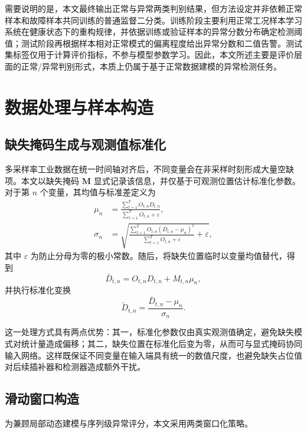 \documentclass[bachelor, vlined]{DissertUESTC}
\begin{document}
    需要说明的是，本文最终输出正常与异常两类判别结果，但方法设定并非依赖正常样本和故障样本共同训练的普通监督二分类。训练阶段主要利用正常工况样本学习系统在健康状态下的重构规律，并依据训练或验证样本的异常分数分布确定检测阈值；测试阶段再根据样本相对正常模式的偏离程度给出异常分数和二值告警。测试集标签仅用于计算评价指标，不参与模型参数学习。因此，本文所述主要是评价层面的正常/异常判别形式，本质上仍属于基于正常数据建模的异常检测任务。

    \section{数据处理与样本构造}

    \subsection{缺失掩码生成与观测值标准化}

    多采样率工业数据在统一时间轴对齐后，不同变量会在非采样时刻形成大量空缺项。本文以缺失掩码 $\mathbf{M}$ 显式记录该信息，并仅基于可观测位置估计标准化参数。对于第 $n$ 个变量，其均值与标准差定义为
    \begin{align}
        \mu_n &= \frac{\sum_{t=1}^{T} O_{t,n} D_{t,n}}{\sum_{t=1}^{T} O_{t,n} + \varepsilon}, \\
        \sigma_n &= \sqrt{\frac{\sum_{t=1}^{T} O_{t,n}(D_{t,n}-\mu_n)^2}{\sum_{t=1}^{T} O_{t,n} + \varepsilon} + \varepsilon},
    \end{align}
    其中 $\varepsilon$ 为防止分母为零的极小常数。随后，将缺失位置临时以变量均值替代，得到
    \begin{equation}
        \bar{D}_{t,n} = O_{t,n} D_{t,n} + M_{t,n} \mu_n,
    \end{equation}
    并执行标准化变换
    \begin{equation}
        \tilde{D}_{t,n} = \frac{\bar{D}_{t,n}-\mu_n}{\sigma_n}.
    \end{equation}

    这一处理方式具有两点优势：其一，标准化参数仅由真实观测值确定，避免缺失模式对统计量造成偏移；其二，缺失位置在标准化后变为零，从而可与显式掩码协同输入网络。这样既保证不同变量在输入端具有统一的数值尺度，也避免缺失占位值对后续插补器和检测器造成额外干扰。

    \subsection{滑动窗口构造}

    为兼顾局部动态建模与序列级异常评分，本文采用两类窗口化策略。
\end{document}
